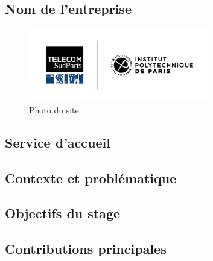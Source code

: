 
\subsection{Nom de l'entreprise}\label{ssec:introduction_nom_entreprise}


\begin{figure}[!h]
    \centering
    \includegraphics[width=0.7\textwidth]{img/LOGO_TSP.png}
    \caption{Photo du site}
    \label{fig:photo_site}
\end{figure}


\subsection{Service d'accueil}\label{ssec:introduction_service_accueil}



\subsection{Contexte et problématique}\label{ssec:introduction_contexte_problematique}



\subsection{Objectifs du stage}\label{ssec:introduction_objectifs}



\subsection{Contributions principales}\label{ssec:introduction_contributions}

